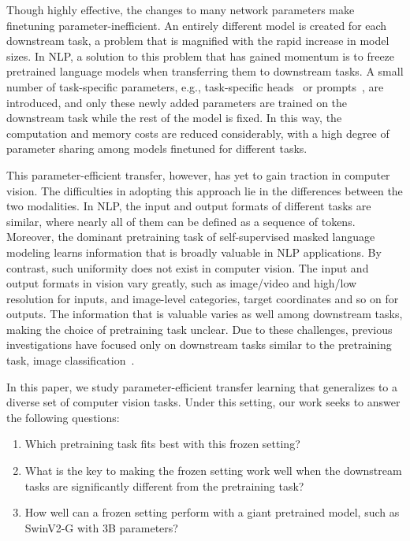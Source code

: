 \documentclass{article}
\begin{document}
Though highly effective, the changes to many network parameters make finetuning parameter-inefficient. An entirely different model is created for each downstream task, a problem that is magnified with the rapid increase in model sizes. In NLP, a solution to this problem that has gained momentum is to freeze pretrained language models when transferring them to downstream tasks. A small number of task-specific parameters, e.g., task-specific heads~\cite{houlsby2019parameter} or prompts~\cite{gpt3,lester2021power,li2021prefix,liu2021ptuning}, are introduced, and only these newly added parameters are trained on the downstream task while the rest of the model is fixed. In this way, the computation and memory costs are reduced considerably, with a high degree of parameter sharing among models finetuned for different tasks.

This parameter-efficient transfer, however, has yet to gain traction in computer vision. The difficulties in adopting this approach lie in the differences between the two modalities. In NLP, the input and output formats of different tasks are similar, where nearly all of them can be defined as a sequence of tokens. Moreover, the dominant pretraining task of self-supervised masked language modeling learns information that is broadly valuable in NLP applications. By contrast, such uniformity does not exist in computer vision. The input and output formats in vision vary greatly, such as image/video and high/low resolution for inputs, and image-level categories, target coordinates and so on for outputs. The information that is valuable varies as well among downstream tasks, making the choice of pretraining task unclear. Due to these challenges, previous investigations have focused only on downstream tasks similar to the pretraining task, image classification~\cite{bilen2017universal,rebuffi2017resadapt,rebuffi2018multidomain,zhang2020side,yao2021cpt,zhou2021vprompt}.

In this paper, we study parameter-efficient transfer learning that generalizes to a diverse set of computer vision tasks. Under this setting, our work seeks to answer the following questions:
\begin{enumerate}
    \item Which pretraining task fits best with this frozen setting?
    \item What is the key to making the frozen setting work well when the downstream tasks are significantly different from the pretraining task?
    \item How well can a frozen setting perform with a giant pretrained model, such as SwinV2-G with 3B parameters?
\end{enumerate}
\end{document}
